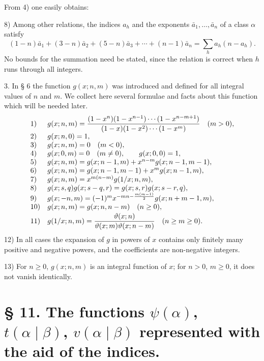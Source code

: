 \documentclass[11pt,a4paper]{article}
\begin{document}
From 4) one easily obtains:

8) Among other relations, the indices $a_h$ and the exponents $\bar a_1,
\ldots,\bar a_n$ of a class $\alpha$ satisfy
\begin{equation}
 (1-n)\bar a_1+(3-n)\bar a_2+(5-n)\bar a_3+\cdots+(n-1)\bar a_n
 =\sum_h a_h(n-a_h).
\tag{3}
\end{equation}
No bounds for the summation need be stated, since the relation is correct when $h$ runs through all integers.

3. In § 6 the function $g(x;n,m)$ was introduced and defined for all integral values of $n$ and $m$. We collect here several formulae and facts about this function which will be needed later.
\[
\begin{array}{ll}
1)&\displaystyle g(x;n,m)={ (1-x^n)(1-x^{n-1})\cdots(1-x^{n-m+1})\over(1-x)(1-x^2)\cdots(1-x^m)}\quad(m>0),\\[1.0ex]
2)&g(x;n,0)=1,\\
3)&g(x;n,m)=0\quad(m<0),\\
4)&g(x;0,m)=0\quad(m\ne0),\qquad g(x;0,0)=1,\\
5)&g(x;n,m)=g(x;n-1,m)+x^{n-m}g(x;n-1,m-1),\\
6)&g(x;n,m)=g(x;n-1,m-1)+x^m g(x;n-1,m),\\
7)&g(x;n,m)=x^{m(n-m)}g(1/x;n,m),\\
8)&g(x;s,q)g(x;s-q,r)=g(x;s,r)g(x;s-r,q),\\
9)&g(x;-n,m)=(-1)^m x^{-mn-{m(m-1)\over2}}g(x;n+m-1,m),\\
10)&g(x;n,m)=g(x;n,n-m)\quad(n\ge0),\\[0.5ex]
11)&\displaystyle g(1/x;n,m)={\vartheta(x;n)\over\vartheta(x;m)\vartheta(x;n-m)}\quad(n\ge m\ge0).
\end{array}
\]
12) In all cases the expansion of $g$ in powers of $x$ contains only finitely many positive and negative powers, and the coefficients are non-negative integers.

13) For $n\ge0$, $g(x;n,m)$ is an integral function of $x$; for $n>0$, $m\ge0$, it does not vanish identically.

\section*{§ 11. The functions $\psi(\alpha)$, $t(\alpha\mid\beta)$, $v(\alpha\mid\beta)$ represented with the aid of the indices.}
\end{document}
